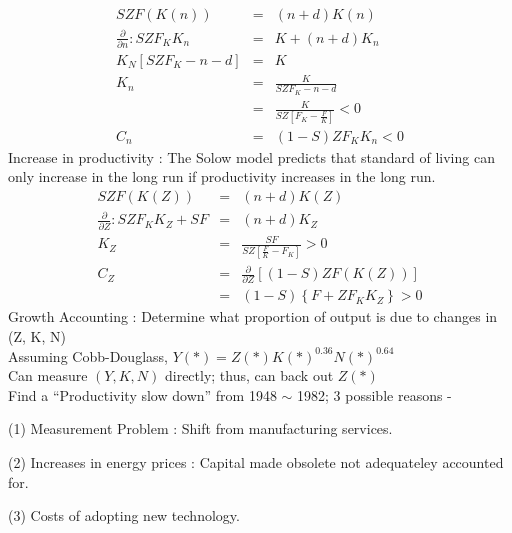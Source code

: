 \begin{eqnarray*}
SZF(K(n)) &=& (n+d) K(n)\\
\frac{\partial}{\partial n} : SZF_K K_n &=& K + (n+d) K_n\\
K_N\left[ SZF_K -n -d\right] &=& K\\
K_n &=& \frac{K}{SZF_K -n - d}\\
&=& \frac{K}{SZ\left[F_K - \frac{F}{K}\right]} < 0\\
C_n &=& (1-S) Z F_K K_n <0
\end{eqnarray*}
Increase in productivity : The Solow model predicts that standard of living can only increase in the long run if productivity increases in the long run.
\begin{eqnarray*}
SZF(K(Z)) &=& (n+d) K(Z)\\
\frac{\partial}{\partial Z} : SZF_K K_Z + SF &=& (n+d) K_Z\\
K_Z &=& \frac{SF}{SZ\left[\frac{F}{K} - F_K\right]} > 0\\
C_Z &=& \frac{\partial}{\partial Z} \left[ (1-S) ZF(K(Z)) \right]\\
&=& (1-S) \left\{ F + ZF_K K_Z\right\} > 0
\end{eqnarray*}
Growth Accounting : Determine what proportion of output is due to changes in (Z, K, N)\\

Assuming Cobb-Douglass, $Y(*) = Z(*) K(*)^{0.36} N(*)^{0.64}$ \\
Can measure $(Y, K, N)$ directly; thus, can back out $Z(*)$\\

Find a ``Productivity slow down'' from 1948 $\sim$ 1982; 3 possible reasons -
\begin{list}{ }{}
\item (1) Measurement Problem : Shift from manufacturing services.
\item (2) Increases in energy prices : Capital made obsolete not adequateley accounted for.
\item (3) Costs of adopting new technology.
\end{list}

